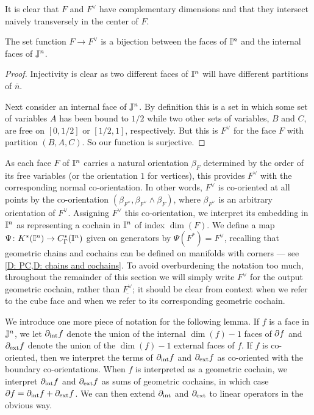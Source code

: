 It is clear that $F$ and $F^\vee$ have complementary dimensions and that they intersect naively transversely in the center of $F$.

\begin{lemma}
	The set function $F \to F^\vee$ is a bijection between the faces of $\mathbb{I}^n$ and the internal faces of $\mathbb{J}^n$.
\end{lemma}

\begin{proof}
	Injectivity is clear as two different faces of $\mathbb{I}^n$ will have different partitions of $\bar n$.

	Next consider an internal face of $\mathbb{J}^n$.
	By definition this is a set in which some set of variables $A$ has been bound to $1/2$ while two other sets of variables, $B$ and $C$, are free on $[0,1/2]$ or $[1/2,1]$, respectively.
	But this is $F^\vee$ for the face $F$ with partition $(B,A,C)$.
	So our function is surjective.
\end{proof}

As each face $F$ of $\mathbb{I}^n$ carries a natural orientation $\beta_F$ determined by the order of its free variables (or the orientation $1$ for vertices), this provides $F^\vee$ with the corresponding normal co-orientation.
In other words, $F^\vee$ is co-oriented at all points by the co-orientation $(\beta_{F^\vee}, \beta_{F^\vee} \wedge \beta_F)$, where $\beta_{F^\vee}$ is an arbitrary orientation of $F^\vee$.
Assigning $F^\vee$ this co-orientation, we interpret its embedding in $\mathbb{I}^n$ as representing a cochain in $\mathbb{I}^n$ of index $\dim(F)$.
We define a map $\Psi \colon K^*(\mathbb{I}^n) \to C_\Gamma^*(\mathbb{I}^n)$ given on generators by $\Psi(F^*) = F^\vee$, recalling that geometric chains and cochains can be defined on manifolds with corners --- see \cref{D: PC,D: chains and cochains}.
To avoid overburdening the notation too much, throughout the remainder of this section we will simply write $F^\vee$ for the output geometric cochain, rather than $\underline{F^\vee}$; it should be clear from context when we refer to the cube face and when we refer to its corresponding geometric cochain.

We introduce one more piece of notation for the following lemma.
If $f$ is a face in $\mathbb{J}^n$, we let $\partial_{\text{int}}f$  denote the union of the internal $\dim(f)-1$ faces of $\partial f$ and $\partial_{\text{ext}}f$  denote the union of the $\dim(f)-1$ external faces of $f$.
If $f$ is co-oriented, then we interpret the terms of $\partial_{\text{int}}f$ and $\partial_{\text{ext}}f$ as co-oriented with the boundary co-orientations.
When $f$ is interpreted as a geometric cochain, we interpret $\partial_{\text{int}}f$ and $\partial_{\text{ext}}f$ as sums of geometric cochains, in which case $\partial f = \partial_{\text{int}}f + \partial_{\text{ext}}f$.
We can then extend $\partial_{\text{int}}$ and $\partial_{\text{ext}}$ to linear operators in the obvious way.

